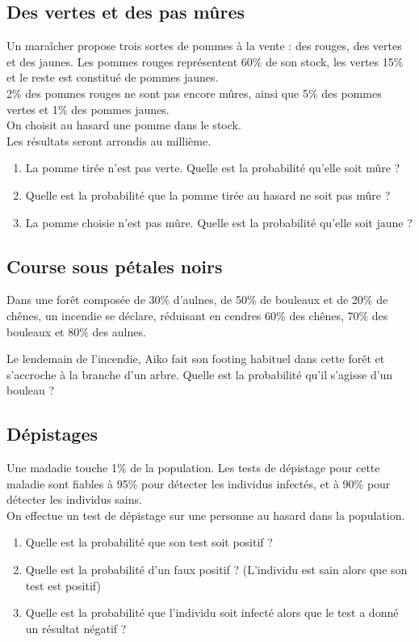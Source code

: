 \documentclass[oneside,12pt]{book}          %
\begin{document}
\subsection{Des vertes et des pas mûres}
 Un maraîcher propose trois sortes de pommes à la vente : des rouges, des vertes et des jaunes. Les pommes rouges représentent 60$\%$ de son stock, les vertes 15$\%$ et le reste est constitué de pommes jaunes. \\
2$\%$ des pommes rouges ne sont pas encore mûres, ainsi que 5$\%$ des pommes vertes et 1$\%$ des pommes jaunes. \\
On choisit au hasard une pomme dans le stock.\\
Les résultats seront arrondis au millième.
\begin{enumerate}
    \item La pomme tirée n'est pas verte. Quelle est la probabilité qu'elle soit mûre ?
    \item Quelle est la probabilité que la pomme tirée au hasard ne soit pas mûre ?
    \item La pomme choisie n'est pas mûre. Quelle est la probabilité qu'elle soit jaune ?
\end{enumerate}



\subsection{Course sous pétales noirs}
Dans une forêt composée de 30$\%$ d'aulnes, de 50$\%$ de bouleaux et de 20$\%$ de chênes, un incendie se déclare, réduisant en cendres 60$\%$ des chênes, 70$\%$ des bouleaux et 80$\%$ des aulnes.

Le lendemain de l'incendie, Aiko fait son footing habituel dans cette forêt et s'accroche à la branche d'un arbre. Quelle est la probabilité qu'il s'agisse d'un bouleau ?


\subsection{Dépistages}
 Une madadie touche 1$\%$ de la population. Les tests de dépistage pour cette maladie sont fiables à 95$\%$ pour détecter les individus infectés, et à 90$\%$ pour détecter les individus sains. \\
On effectue un test de dépistage sur une personne au hasard dans la population.
\begin{enumerate}
    \item Quelle est la probabilité que son test soit positif ?
    \item Quelle est la probabilité d'un faux positif ? (L'individu est sain alors que son test est positif)
    \item Quelle est la probabilité que l'individu soit infecté alors que le test a donné un résultat négatif ?
\end{enumerate}
\end{document}
